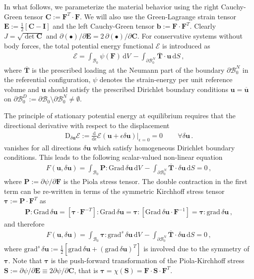 \documentclass[times,doublespace]{nmeauth}
\newcommand*{\gz}[1]{\boldsymbol{#1}}
\newcommand*{\Grad}{\mathrm{Grad}}
\newcommand*{\grad}{\mathrm{grad}}
\renewcommand*{\d}{\mathrm{d}}
\newcommand*{\D}{\mathrm{D}}
\newcommand*{\mcl}[1]{\mathcal{#1}}
\begin{document}
In what follows, we parameterize the material behavior using the right Cauchy-Green tensor $\gz C := \gz F^T \cdot \gz F$.
We will also use the Green-Lagrange strain tensor $\gz E:=\frac{1}{2}\left[\gz C - \gz I\right]$ and the left Cauchy-Green tensor $\gz b := \gz F \cdot \gz F^T$.
Clearly $J = \sqrt{\det \gz C}$ and $\partial (\bullet)/\partial \gz E = 2\, \partial (\bullet)/\partial \gz C$.
%
For conservative systems without body forces, the total potential energy functional $\mcl E$ is introduced as
\begin{align}
\mcl E =
\int_{\mcl B_0} \mcl \psi(\gz F) \, \d V \,
- \int_{\partial \mcl B_0^N} \overline{\gz T} \cdot \gz u \, \d S \, ,
\end{align}
where $\overline{\gz T}$ is the prescribed loading at the Neumann part of the boundary $\partial \mcl B_0^N$ in the referential configuration, $\mcl \psi$ denotes the strain-energy per unit reference volume and $\gz u$ should satisfy the prescribed Dirichlet boundary conditions $\gz u = \overline{\gz u}$ on $\partial \mcl B_0^D := \partial \mcl B_0 \setminus \partial \mcl B_0^N \neq \emptyset $.

The principle of stationary potential energy at equilibrium requires that the directional derivative with respect to the displacement
\begin{align}
\D_{\displaystyle \delta \gz u} \mcl E :=
\frac{\d}{\d \epsilon} \mcl E (\gz u + \epsilon \delta \gz u) \Bigr\rvert_{\epsilon=0}  = 0 \, \qquad \forall \delta \gz u \, .
\label{eq:stationary}
\end{align}
vanishes for all directions $\delta \gz u$ which satisfy homogeneous Dirichlet boundary conditions.
%
This leads to the following scalar-valued non-linear equation
\begin{align}
F(\gz u, \delta \gz u) =
\int_{\mcl B_0} \gz P : \Grad \, \delta \gz u \, \d V \,
-
\int_{\partial \mcl B_0^N} \overline{\gz T} \cdot \delta \gz u \, \d S
= 0 \, ,
\end{align}
where $\gz P := \partial \mcl \psi / \partial \gz F$ is the Piola stress tensor.
The double contraction in the first term can be re-written in terms of the symmetric Kirchhoff stress tensor $\gz \tau := \gz P \cdot \gz F^T$ as
\begin{align}
\gz P : \Grad \, \delta \gz u =
\left[\gz \tau \cdot \gz F^{-T}\right] : \Grad \, \delta \gz u =
\gz \tau : \left[\Grad \, \delta \gz u \cdot \gz F^{-1}\right] =
\gz \tau : \grad \, \delta \gz u \, ,
\end{align}
and therefore
\begin{align}
  F(\gz u, \delta \gz u) =
  \int_{\mcl B_0} \gz \tau : \grad^{s} \, \delta \gz u \, \d V \,
  -
  \int_{\partial \mcl B_0^N} \overline{\gz T} \cdot \delta \gz u \, \d S
  = 0 \, ,
\label{eq:weak_form}
\end{align}
where $\grad^{s} \, \delta \gz u := \frac{1}{2}\left[ \grad \, \delta \gz u + ( \grad \, \delta \gz u)^T\right]$
is involved due to the symmetry of $\gz \tau$.
Note that $\gz \tau$ is the push-forward transformation of the Piola-Kirchhoff stress $\gz S := \partial \mcl \psi / \partial \gz E \equiv 2 \partial \mcl \psi / \partial \gz C$,
that is $\gz \tau = \chi(\gz S) = \gz F \cdot \gz S \cdot \gz F^T$.
\end{document}
